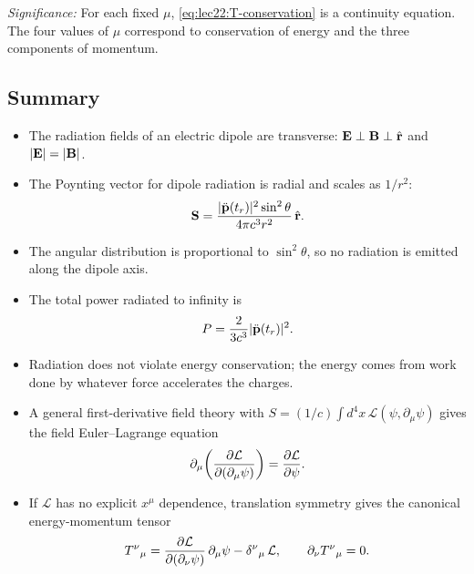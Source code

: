 \textit{Significance:} For each fixed $\mu$, \eqref{eq:lec22:T-conservation} is a
continuity equation. The four values of $\mu$ correspond to conservation of energy and
the three components of momentum.


\subsection*{Summary}

\begin{itemize}
  \item The radiation fields of an electric dipole are transverse:
        $\mathbf{E}\perp\mathbf{B}\perp\hat{\mathbf{r}}$ and $|\mathbf{E}|=|\mathbf{B}|$.
  \item The Poynting vector for dipole radiation is radial and scales as $1/r^2$:
        \[
          \mathbf{S}
          = \frac{|\ddot{\mathbf{p}}(t_r)|^2\sin^2\theta}{4\pi c^3 r^2}\,\hat{\mathbf{r}}.
        \]
  \item The angular distribution is proportional to $\sin^2\theta$, so no radiation is
        emitted along the dipole axis.
  \item The total power radiated to infinity is
        \[
          P=\frac{2}{3c^3}|\ddot{\mathbf{p}}(t_r)|^2.
        \]
  \item Radiation does not violate energy conservation; the energy comes from work done
        by whatever force accelerates the charges.
  \item A general first-derivative field theory with
        $S=(1/c)\int d^4x\,\mathcal{L}(\psi,\partial_\mu\psi)$ gives the field
        Euler--Lagrange equation
        \[
          \partial_\mu\qty(\pdv{\mathcal{L}}{(\partial_\mu\psi)})
          =\pdv{\mathcal{L}}{\psi}.
        \]
  \item If $\mathcal{L}$ has no explicit $x^\mu$ dependence, translation symmetry gives
        the canonical energy-momentum tensor
        \[
          T^\nu{}_\mu
          =
          \pdv{\mathcal{L}}{(\partial_\nu\psi)}\,\partial_\mu\psi
          -\delta^\nu{}_\mu\,\mathcal{L},
          \qquad
          \partial_\nu T^\nu{}_\mu=0.
        \]
\end{itemize}
